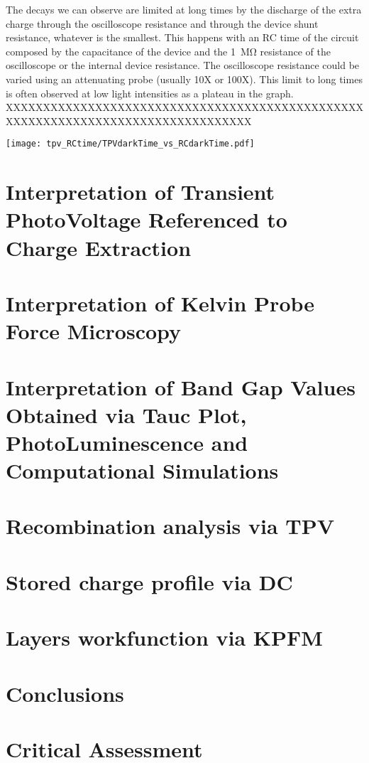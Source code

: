 The decays we can observe are limited at long times by the discharge of the extra charge through the oscilloscope resistance and through the device shunt resistance, whatever is the smallest. This happens with an RC time of the circuit composed by the capacitance of the device and the \SI{1}{\Mohm} resistance of the oscilloscope or the internal device resistance. The oscilloscope resistance could be varied using an attenuating probe (usually 10X or 100X). This limit to long times is often observed at low light intensities as a plateau in the  graph. XXXXXXXXXXXXXXXXXXXXXXXXXXXXXXXXXXXXXXXXXXXXXXXXXXXXXXXXXXXXXXXXXXXXXXXXXXXXXXXXX

\begin{SCfigure}
	\centering
	\texttt{[image: tpv\_RCtime/TPVdarkTime\_vs\_RCdarkTime.pdf]}
	\label{fig:tpv_RCtime}
\end{SCfigure}

\section{Interpretation of Transient PhotoVoltage Referenced to Charge Extraction}\label{interpretation_tpvce}

\section{Interpretation of Kelvin Probe Force Microscopy}\label{interpretation_kpfm}

\section{Interpretation of Band Gap Values Obtained via Tauc Plot, PhotoLuminescence and Computational Simulations}\label{interpretation_bg}



\section{Recombination analysis via TPV}
\section{Stored charge profile via DC}
\section{Layers workfunction via KPFM}
\section{Conclusions}
\section{Critical Assessment}
